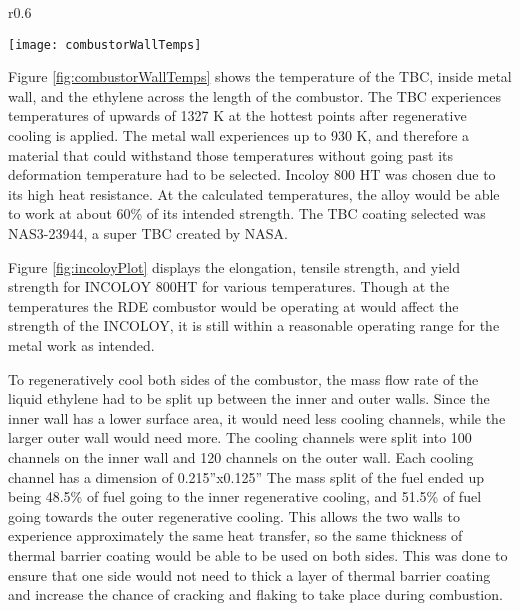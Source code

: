 \begin{wrapfigure}{r}{0.6\textwidth}
\begin{center}
\texttt{[image: combustorWallTemps]}
\caption{Temperature Range Across Combustor Structure}
\label{fig:combustorWallTemps}
\end{center}
\end{wrapfigure}

Figure \ref{fig:combustorWallTemps} shows the temperature of the TBC, inside metal wall, and the ethylene across the length of the combustor. The TBC experiences temperatures of upwards of 1327 K at the hottest points after regenerative cooling is applied. The metal wall experiences up to 930 K, and therefore a material that could withstand those temperatures without going past its deformation temperature had to be selected. Incoloy 800 HT was chosen due to its high heat resistance. At the calculated temperatures, the alloy would be able to work at about 60\% of its intended strength. The TBC coating selected was NAS3-23944, a super TBC created by NASA.

Figure \ref{fig:incoloyPlot} displays the elongation, tensile strength, and yield strength for INCOLOY 800HT for various temperatures. Though at the temperatures the RDE combustor would be operating at would affect the strength of the INCOLOY, it is still within a reasonable operating range for the metal work as intended.

To regeneratively cool both sides of the combustor, the mass flow rate of the liquid ethylene had to be split up between the inner and outer walls. Since the inner wall has a lower surface area, it would need less cooling channels, while the larger outer wall would need more. The cooling channels were split into 100 channels on the inner wall and 120 channels on the outer wall. Each cooling channel has a dimension of 0.215”x0.125” The mass split of the fuel ended up being 48.5\% of fuel going to the inner regenerative cooling, and 51.5\% of fuel going towards the outer regenerative cooling.  This allows the two walls to experience approximately the same heat transfer, so the same thickness of thermal barrier coating would be able to be used on both sides. This was done to ensure that one side would not need to thick a layer of thermal barrier coating and increase the chance of cracking and flaking to take place during combustion.

